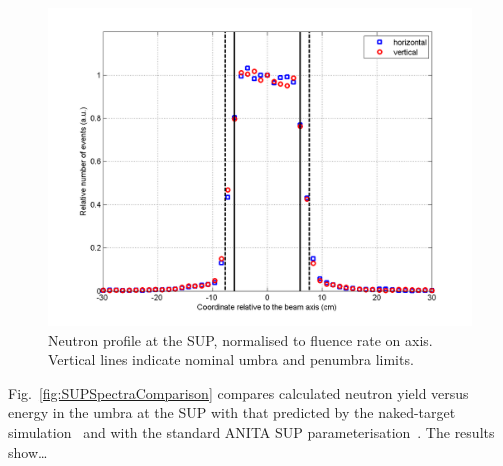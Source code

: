 \documentclass[11pt,a4paper]{IEEEtran}
\let\MYoriglatexcaption\caption
\renewcommand{\caption}[2][\relax]{\MYoriglatexcaption[#2]{#2}}
\begin{document}
\begin{figure}[t]
    \includegraphics[width=\columnwidth]{SUP10beamproFoldingRADECS.png}
    \caption{
        Neutron profile at the SUP, normalised to fluence rate on axis.
        Vertical lines indicate nominal umbra and penumbra limits.
    }
    \label{fig:SUPProfile}
\end{figure}

Fig.~\ref{fig:SUPSpectraComparison} compares calculated neutron yield versus energy in the umbra at the SUP with that predicted by the naked-target simulation~\cite{Platt13} and with the standard ANITA SUP parameterisation~\cite{Prokofiev2009}.
The results show\ldots
{}
\end{document}
